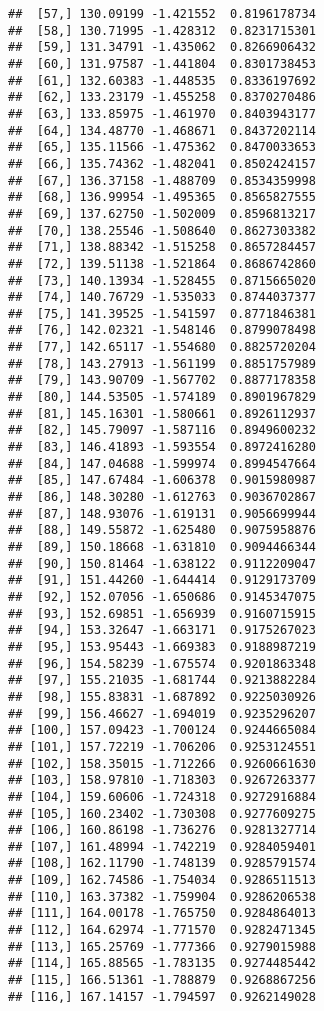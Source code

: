 \documentclass[]{book}
\theoremstyle{definition}
\theoremstyle{definition}
\theoremstyle{definition}
\theoremstyle{remark}
\begin{document}
\begin{verbatim}
##  [57,] 130.09199 -1.421552  0.8196178734
##  [58,] 130.71995 -1.428312  0.8231715301
##  [59,] 131.34791 -1.435062  0.8266906432
##  [60,] 131.97587 -1.441804  0.8301738453
##  [61,] 132.60383 -1.448535  0.8336197692
##  [62,] 133.23179 -1.455258  0.8370270486
##  [63,] 133.85975 -1.461970  0.8403943177
##  [64,] 134.48770 -1.468671  0.8437202114
##  [65,] 135.11566 -1.475362  0.8470033653
##  [66,] 135.74362 -1.482041  0.8502424157
##  [67,] 136.37158 -1.488709  0.8534359998
##  [68,] 136.99954 -1.495365  0.8565827555
##  [69,] 137.62750 -1.502009  0.8596813217
##  [70,] 138.25546 -1.508640  0.8627303382
##  [71,] 138.88342 -1.515258  0.8657284457
##  [72,] 139.51138 -1.521864  0.8686742860
##  [73,] 140.13934 -1.528455  0.8715665020
##  [74,] 140.76729 -1.535033  0.8744037377
##  [75,] 141.39525 -1.541597  0.8771846381
##  [76,] 142.02321 -1.548146  0.8799078498
##  [77,] 142.65117 -1.554680  0.8825720204
##  [78,] 143.27913 -1.561199  0.8851757989
##  [79,] 143.90709 -1.567702  0.8877178358
##  [80,] 144.53505 -1.574189  0.8901967829
##  [81,] 145.16301 -1.580661  0.8926112937
##  [82,] 145.79097 -1.587116  0.8949600232
##  [83,] 146.41893 -1.593554  0.8972416280
##  [84,] 147.04688 -1.599974  0.8994547664
##  [85,] 147.67484 -1.606378  0.9015980987
##  [86,] 148.30280 -1.612763  0.9036702867
##  [87,] 148.93076 -1.619131  0.9056699944
##  [88,] 149.55872 -1.625480  0.9075958876
##  [89,] 150.18668 -1.631810  0.9094466344
##  [90,] 150.81464 -1.638122  0.9112209047
##  [91,] 151.44260 -1.644414  0.9129173709
##  [92,] 152.07056 -1.650686  0.9145347075
##  [93,] 152.69851 -1.656939  0.9160715915
##  [94,] 153.32647 -1.663171  0.9175267023
##  [95,] 153.95443 -1.669383  0.9188987219
##  [96,] 154.58239 -1.675574  0.9201863348
##  [97,] 155.21035 -1.681744  0.9213882284
##  [98,] 155.83831 -1.687892  0.9225030926
##  [99,] 156.46627 -1.694019  0.9235296207
## [100,] 157.09423 -1.700124  0.9244665084
## [101,] 157.72219 -1.706206  0.9253124551
## [102,] 158.35015 -1.712266  0.9260661630
## [103,] 158.97810 -1.718303  0.9267263377
## [104,] 159.60606 -1.724318  0.9272916884
## [105,] 160.23402 -1.730308  0.9277609275
## [106,] 160.86198 -1.736276  0.9281327714
## [107,] 161.48994 -1.742219  0.9284059401
## [108,] 162.11790 -1.748139  0.9285791574
## [109,] 162.74586 -1.754034  0.9286511513
## [110,] 163.37382 -1.759904  0.9286206538
## [111,] 164.00178 -1.765750  0.9284864013
## [112,] 164.62974 -1.771570  0.9282471345
## [113,] 165.25769 -1.777366  0.9279015988
## [114,] 165.88565 -1.783135  0.9274485442
## [115,] 166.51361 -1.788879  0.9268867256
## [116,] 167.14157 -1.794597  0.9262149028

\end{verbatim}
\end{document}
